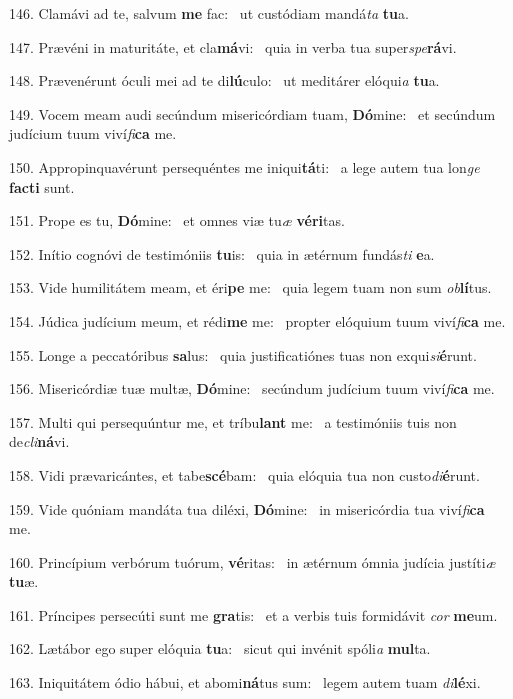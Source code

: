 146. Clamávi ad te, salvum \textbf{me} fac: \ast\  ut custódiam mandá\textit{ta} \textbf{tu}a.\

147. Prævéni in maturitáte, et cla\textbf{má}vi: \ast\  quia in verba tua super\textit{spe}\textbf{rá}vi.\

148. Prævenérunt óculi mei ad te di\textbf{lú}culo: \ast\  ut meditárer elóqui\textit{a} \textbf{tu}a.\

149. Vocem meam audi secúndum misericórdiam tuam, \textbf{Dó}mine: \ast\  et secúndum judícium tuum viví\textit{fi}\textbf{ca} me.\

150. Appropinquavérunt persequéntes me iniqui\textbf{tá}ti: \ast\  a lege autem tua lon\textit{ge} \textbf{fac}\textbf{ti} sunt.\

151. Prope es tu, \textbf{Dó}mine: \ast\  et omnes viæ tu\textit{æ} \textbf{vé}\textbf{ri}tas.\

152. Inítio cognóvi de testimóniis \textbf{tu}is: \ast\  quia in ætérnum fundás\textit{ti} \textbf{e}a.\

153. Vide humilitátem meam, et éri\textbf{pe} me: \ast\  quia legem tuam non sum \textit{ob}\textbf{lí}tus.\

154. Júdica judícium meum, et rédi\textbf{me} me: \ast\  propter elóquium tuum viví\textit{fi}\textbf{ca} me.\

155. Longe a peccatóribus \textbf{sa}lus: \ast\  quia justificatiónes tuas non exqui\textit{si}\textbf{é}runt.\

156. Misericórdiæ tuæ multæ, \textbf{Dó}mine: \ast\  secúndum judícium tuum viví\textit{fi}\textbf{ca} me.\

157. Multi qui persequúntur me, et tríbu\textbf{lant} me: \ast\  a testimóniis tuis non de\textit{cli}\textbf{ná}vi.\

158. Vidi prævaricántes, et tabe\textbf{scé}bam: \ast\  quia elóquia tua non custo\textit{di}\textbf{é}runt.\

159. Vide quóniam mandáta tua diléxi, \textbf{Dó}mine: \ast\  in misericórdia tua viví\textit{fi}\textbf{ca} me.\

160. Princípium verbórum tuórum, \textbf{vé}ritas: \ast\  in ætérnum ómnia judícia justíti\textit{æ} \textbf{tu}æ.\

161. Príncipes persecúti sunt me \textbf{gra}tis: \ast\  et a verbis tuis formidávit \textit{cor} \textbf{me}um.\

162. Lætábor ego super elóquia \textbf{tu}a: \ast\  sicut qui invénit spóli\textit{a} \textbf{mul}ta.\

163. Iniquitátem ódio hábui, et abomi\textbf{ná}tus sum: \ast\  legem autem tuam \textit{di}\textbf{lé}xi.\

